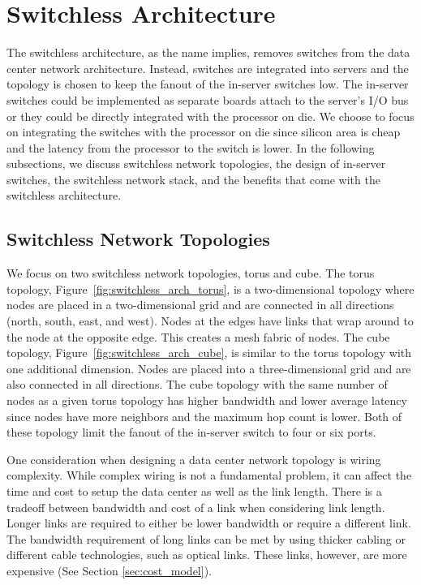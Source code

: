 \vspace{-0.1in}
\section{Switchless Architecture}
\label{sec:arch}

The switchless architecture, as the name implies, removes switches from the data center network architecture.  Instead, switches are integrated into servers and the topology is chosen to keep the fanout of the in-server switches low.  The in-server switches could be implemented as separate boards attach to the server's I/O bus or they could be directly integrated with the processor on die.  We choose to focus on integrating the switches with the processor on die since silicon area is cheap and the latency from the processor to the switch is lower.  In the following subsections, we discuss switchless network topologies, the design of in-server switches, the switchless network stack, and the benefits that come with the switchless architecture.

\subsection{Switchless Network Topologies}

We focus on two switchless network topologies, torus and cube.  The torus topology, Figure~\ref{fig:switchless_arch_torus}, is a two-dimensional topology where nodes are placed in a two-dimensional grid and are connected in all directions (north, south, east, and west).  Nodes at the edges have links that wrap around to the node at the opposite edge.  This creates a mesh fabric of nodes.  The cube topology, Figure~\ref{fig:switchless_arch_cube}, is similar to the torus topology with one additional dimension.  Nodes are placed into a three-dimensional grid and are also connected in all directions.  The cube topology with the same number of nodes as a given torus topology has higher bandwidth and lower average latency since nodes have more neighbors and the maximum hop count is lower.  Both of these topology limit the fanout of the in-server switch to four or six ports.

One consideration when designing a data center network topology is wiring complexity.  While complex wiring is not a fundamental problem, it can affect the time and cost to setup the data center as well as the link length.  There is a tradeoff between bandwidth and cost of a link when considering link length.  Longer links are required to either be lower bandwidth or require a different link.  The bandwidth requirement of long links can be met by using thicker cabling or different cable technologies, such as optical links.  These links, however, are more expensive (See Section \ref{sec:cost_model}).

